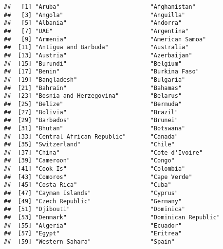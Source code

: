 \documentclass[
]{article}
\newenvironment{Shaded}{\begin{snugshade}}{\end{snugshade}}
\newcommand{\FunctionTok}[1]{\textcolor[rgb]{0.13,0.29,0.53}{\textbf{#1}}}
\newcommand{\NormalTok}[1]{#1}
\newcommand{\SpecialCharTok}[1]{\textcolor[rgb]{0.81,0.36,0.00}{\textbf{#1}}}
\begin{document}
\begin{Shaded}
\end{Shaded}

\begin{verbatim}
##   [1] "Aruba"                          "Afghanistan"                   
##   [3] "Angola"                         "Anguilla"                      
##   [5] "Albania"                        "Andorra"                       
##   [7] "UAE"                            "Argentina"                     
##   [9] "Armenia"                        "American Samoa"                
##  [11] "Antigua and Barbuda"            "Australia"                     
##  [13] "Austria"                        "Azerbaijan"                    
##  [15] "Burundi"                        "Belgium"                       
##  [17] "Benin"                          "Burkina Faso"                  
##  [19] "Bangladesh"                     "Bulgaria"                      
##  [21] "Bahrain"                        "Bahamas"                       
##  [23] "Bosnia and Herzegovina"         "Belarus"                       
##  [25] "Belize"                         "Bermuda"                       
##  [27] "Bolivia"                        "Brazil"                        
##  [29] "Barbados"                       "Brunei"                        
##  [31] "Bhutan"                         "Botswana"                      
##  [33] "Central African Republic"       "Canada"                        
##  [35] "Switzerland"                    "Chile"                         
##  [37] "China"                          "Cote d'Ivoire"                 
##  [39] "Cameroon"                       "Congo"                         
##  [41] "Cook Is"                        "Colombia"                      
##  [43] "Comoros"                        "Cape Verde"                    
##  [45] "Costa Rica"                     "Cuba"                          
##  [47] "Cayman Islands"                 "Cyprus"                        
##  [49] "Czech Republic"                 "Germany"                       
##  [51] "Djibouti"                       "Dominica"                      
##  [53] "Denmark"                        "Dominican Republic"            
##  [55] "Algeria"                        "Ecuador"                       
##  [57] "Egypt"                          "Eritrea"                       
##  [59] "Western Sahara"                 "Spain"                         

\end{verbatim}
\end{document}
